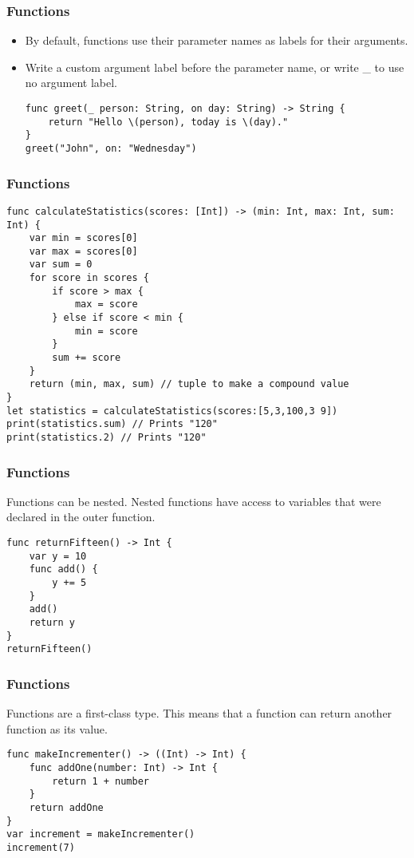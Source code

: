 \begin{frame}[fragile] \frametitle{Functions}

\begin{itemize}
\item By default, functions use their parameter names as labels for their arguments. 
\item Write a custom argument label before the parameter name, or write \_ to use no argument label.

\begin{lstlisting}
func greet(_ person: String, on day: String) -> String {
    return "Hello \(person), today is \(day)."
}
greet("John", on: "Wednesday")
\end{lstlisting}

\end{itemize}
\end{frame}

\begin{frame}[fragile] \frametitle{Functions}

\begin{lstlisting}
func calculateStatistics(scores: [Int]) -> (min: Int, max: Int, sum: Int) {
    var min = scores[0]
    var max = scores[0]
    var sum = 0
    for score in scores {
        if score > max {
            max = score
        } else if score < min {
            min = score
        }
        sum += score
    }
    return (min, max, sum) // tuple to make a compound value
}
let statistics = calculateStatistics(scores:[5,3,100,3 9])
print(statistics.sum) // Prints "120"
print(statistics.2) // Prints "120"
\end{lstlisting}
\end{frame}

\begin{frame}[fragile] \frametitle{Functions}
Functions can be nested. Nested functions have access to variables that were declared in the outer function.


\begin{lstlisting}
func returnFifteen() -> Int {
    var y = 10
    func add() {
        y += 5
    }
    add()
    return y
}
returnFifteen()
\end{lstlisting}


\end{frame}

\begin{frame}[fragile] \frametitle{Functions}

Functions are a first-class type. This means that a function can return another function as its value.
\begin{lstlisting}
func makeIncrementer() -> ((Int) -> Int) {
    func addOne(number: Int) -> Int {
        return 1 + number
    }
    return addOne
}
var increment = makeIncrementer()
increment(7)
\end{lstlisting}

\end{frame}


